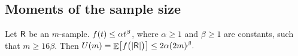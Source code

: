 \subsection{Moments of the sample size}


\newcommand{\cEFunc}[1]{U\pth{#1}}
\newcommand{\cFuncX}[1]{f\pth{#1}}%
\begin{lemma}
    Let $\mathsf{R}$ be an $m$-sample. 
    $\cFuncX{t} \leq \alpha t^\beta$, where $\alpha\geq 1$ and
    $\beta\geq 1$ are constants, such that $m \geq 16\beta$. Then
    \begin{math}
        \cEFunc{m} = \Ex{\bigl.  \cFuncX{\bigl. \cardin{\Sample}} } \leq 2
        \alpha (2m)^\beta.
    \end{math}
\end{lemma}
